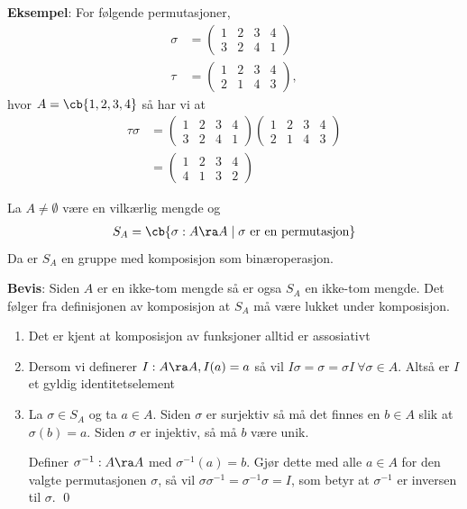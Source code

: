 \textbf{Eksempel}: For følgende permutasjoner,
\begin{align}
	\sigma & = \begin{pmatrix} 1 & 2 & 3 & 4 \\ 3 & 2 & 4 & 1 \end{pmatrix}  \\
	\tau   & = \begin{pmatrix} 1 & 2 & 3 & 4 \\ 2 & 1 & 4 & 3 \end{pmatrix},
\end{align}
hvor $A=\cb{1, 2, 3, 4}$ så har vi at
\begin{align}
	\tau\sigma & =\begin{pmatrix} 1 & 2 & 3 & 4 \\ 3 & 2 & 4 & 1 \end{pmatrix}
	\begin{pmatrix} 1 & 2 & 3 & 4 \\ 2 & 1 & 4 & 3 \end{pmatrix}               \\
	           & = \begin{pmatrix} 1 & 2 & 3 & 4 \\ 4 & 1 & 3 & 2\end{pmatrix}
\end{align}

\begin{theorem*}{}{}
	La $A\neq \emptyset$ være en vilkærlig mengde og
	\begin{align}
		S_A=\cb{\sigma:A\ra A\mid\sigma \text{ er en permutasjon}}
	\end{align}
	Da er $S_A$ en gruppe med komposisjon som binæroperasjon.
\end{theorem*}
\textbf{Bevis}: Siden $A$ er en ikke-tom mengde så er ogsa $S_A$ en ikke-tom mengde. Det følger
fra definisjonen av komposisjon at $S_A$ må være lukket under komposisjon.
\begin{enumerate}[label=$\mathscr{G}$\arabic*)]
	\item Det er kjent at komposisjon av funksjoner alltid er assosiativt
	\item Dersom vi definerer $I: A\ra A, I(a)=a$ så vil
	      $I\sigma=\sigma=\sigma I\ \forall \sigma\in A$. Altså er $I$ et gyldig identitetselement
	\item La $\sigma\in S_A$ og ta $a\in A$. Siden $\sigma$ er surjektiv så må det finnes en
	      $b\in A$ slik at $\sigma(b)=a$. Siden $\sigma$ er injektiv, så må $b$ være unik.

	      Definer $\sigma^{-1}:A\ra A$ med $\sigma^{-1}(a)=b$. Gjør dette med alle $a\in A$ for
	      den valgte permutasjonen $\sigma$, så vil $\sigma\sigma^{-1}=\sigma^{-1}\sigma=I$, som
	      betyr at $\sigma^{-1}$ er inversen til $\sigma$. \qed
\end{enumerate}

